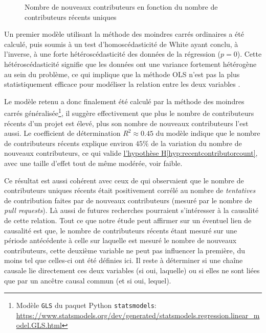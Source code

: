 \documentclass[dvipsnames]{llncs}
\newcommand{\en}[1]{\foreignlanguage{english}{\emph{#1}}}
\begin{document}
\begin{figure}
        

        

        \caption{Nombre de nouveaux contributeurs en fonction du nombre de contributeurs récents uniques}
        \label{fig:contributorCount}
    \end{figure}

    Un premier modèle utilisant la méthode des moindres carrés ordinaires a été calculé, puis soumis à un test
    d'homoscédasticité de White ayant conclu, à l'inverse, à une forte hétéroscédasticité des données de la
    régression ($p = 0$). Cette hétéroscédasticité signifie que les données ont une variance fortement
    hétérogène au sein du problème, ce qui implique que la méthode OLS n'est pas la plus statistiquement
    efficace pour modéliser la relation entre les deux variables \parencite{GLS-2021}.

    Le modèle retenu a donc finalement été calculé par la méthode des moindres carrés
    généralisée\footnote{Modèle \texttt{GLS} du paquet Python \texttt{statsmodels}:
    \url{https://www.statsmodels.org/dev/generated/statsmodels.regression.linear_model.GLS.html}}, il suggère
    effectivement que plus le nombre de contributeurs récents d'un projet est élevé, plus son nombre de
    nouveaux contributeurs l'est aussi. Le coefficient de détermination $R^2 \approx 0.45$ du modèle indique
    que le nombre de contributeurs récents explique environ $45\%$ de la variation du nombre de nouveaux
    contributeurs, ce qui valide \hyperref[hyp:recentcontributorcount]{l'hypothèse
    H\ref*{hyp:recentcontributorcount}}, avec une taille d'effet tout de même modérée, voir faible.

    Ce résultat est aussi cohérent avec ceux de \textcite[p.~12-13,16]{signals-2019} qui observaient que le
    nombre de contributeurs uniques récents était positivement corrélé au nombre de \emph{tentatives} de
    contribution faites par de nouveaux contributeurs (mesuré par le nombre de \en{pull requests}). Là aussi
    de futures recherches pourraient s'intéresser à la causalité de cette relation. Tout ce que notre étude
    peut affirmer sur un éventuel lien de causalité est que, le nombre de contributeurs récents étant mesuré
    sur une période antécédente à celle sur laquelle est mesuré le nombre de nouveaux contributeurs, cette
    deuxième variable ne peut pas influencer la première, du moins tel que celles-ci ont été définies ici. Il
    reste à déterminer si une chaîne causale lie directement ces deux variables (si oui, laquelle) ou si elles
    ne sont liées que par un ancêtre causal commun (et si oui, lequel).
\end{document}
